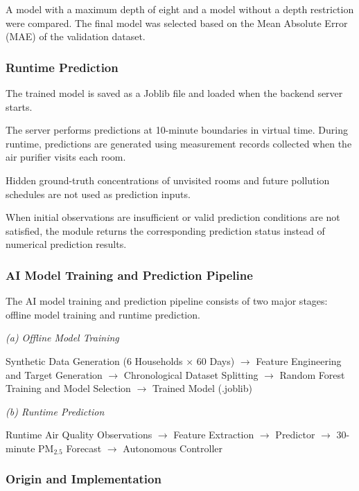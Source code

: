 \documentclass[conference]{IEEEtran}
\newcommand{\pmfine}{\ensuremath{\mathrm{PM}_{2.5}}}
\begin{document}
A model with a maximum depth of eight and a model without a depth restriction were compared. The final model was selected based on the Mean Absolute Error (MAE) of the validation dataset.

\subsubsection{Runtime Prediction}

The trained model is saved as a Joblib file and loaded when the backend server starts.

The server performs predictions at 10-minute boundaries in virtual time. During runtime, predictions are generated using measurement records collected when the air purifier visits each room.

Hidden ground-truth concentrations of unvisited rooms and future pollution schedules are not used as prediction inputs.

When initial observations are insufficient or valid prediction conditions are not satisfied, the module returns the corresponding prediction status instead of numerical prediction results.

\subsubsection{AI Model Training and Prediction Pipeline}

The AI model training and prediction pipeline consists of two major stages: offline model training and runtime prediction.

\emph{(a) Offline Model Training}

Synthetic Data Generation (6 Households \ensuremath{\times} 60 Days) \ensuremath{\rightarrow} Feature Engineering and Target Generation \ensuremath{\rightarrow} Chronological Dataset Splitting \ensuremath{\rightarrow} Random Forest Training and Model Selection \ensuremath{\rightarrow} Trained Model (.joblib)

\emph{(b) Runtime Prediction}

Runtime Air Quality Observations \ensuremath{\rightarrow} Feature Extraction \ensuremath{\rightarrow} Predictor \ensuremath{\rightarrow} 30-minute \pmfine{} Forecast \ensuremath{\rightarrow} Autonomous Controller

\subsubsection{Origin and Implementation}
\end{document}
